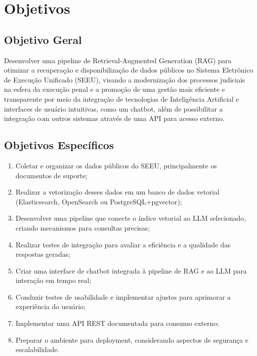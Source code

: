 
\section{Objetivos}
\label{sec:objetivos}

\subsection{Objetivo Geral}
Desenvolver uma pipeline de Retrieval-Augmented Generation (RAG) para otimizar a recuperação e disponibilização de dados públicos no Sistema Eletrônico de Execução Unificado (SEEU), visando a modernização dos processos judiciais na esfera da execução penal e a promoção de uma gestão mais eficiente e transparente por meio da integração de tecnologias de Inteligência Artificial e interfaces de usuário intuitivas, como um chatbot, além de possibilitar a integração com outros sistemas através de uma API para acesso externo.

\subsection{Objetivos Específicos}
\begin{enumerate}[label=\arabic*.]
  \item Coletar e organizar os dados públicos do SEEU, principalmente os documentos de suporte;
  \item Realizar a vetorização desses dados em um banco de dados vetorial (Elasticsearch, OpenSearch ou PostgreSQL+pgvector);
  \item Desenvolver uma pipeline que conecte o índice vetorial ao LLM selecionado, criando mecanismos para consultas precisas;
  \item Realizar testes de integração para avaliar a eficiência e a qualidade das respostas geradas;
  \item Criar uma interface de chatbot integrada à pipeline de RAG e ao LLM para interação em tempo real;
  \item Conduzir testes de usabilidade e implementar ajustes para aprimorar a experiência do usuário;
  \item Implementar uma API REST documentada para consumo externo;
  \item Preparar o ambiente para deployment, considerando aspectos de segurança e escalabilidade.
\end{enumerate}


